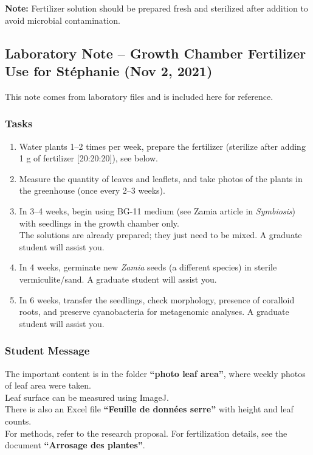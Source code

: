 \documentclass[
  11pt,
]{article}
\providecommand{\tightlist}{%
  \setlength{\itemsep}{0pt}\setlength{\parskip}{0pt}}
\begin{document}
\textbf{Note:} Fertilizer solution should be prepared fresh and
sterilized after addition to avoid microbial contamination.

\subsection{Laboratory Note -- Growth Chamber Fertilizer Use for
Stéphanie (Nov 2,
2021)}\label{laboratory-note-growth-chamber-fertilizer-use-for-stuxe9phanie-nov-2-2021}

This note comes from laboratory files and is included here for
reference.

\subsubsection{Tasks}\label{tasks}

\begin{enumerate}
\def\labelenumi{\arabic{enumi}.}
\tightlist
\item
  Water plants 1--2 times per week, prepare the fertilizer (sterilize
  after adding 1 g of fertilizer {[}20:20:20{]}), see below.\\
\item
  Measure the quantity of leaves and leaflets, and take photos of the
  plants in the greenhouse (once every 2--3 weeks).\\
\item
  In 3--4 weeks, begin using BG-11 medium (see Zamia article in
  \emph{Symbiosis}) with seedlings in the growth chamber only.\\
  The solutions are already prepared; they just need to be mixed. A
  graduate student will assist you.\\
\item
  In 4 weeks, germinate new \emph{Zamia} seeds (a different species) in
  sterile vermiculite/sand. A graduate student will assist you.\\
\item
  In 6 weeks, transfer the seedlings, check morphology, presence of
  coralloid roots, and preserve cyanobacteria for metagenomic analyses.
  A graduate student will assist you.
\end{enumerate}

\subsubsection{Student Message}\label{student-message}

The important content is in the folder \textbf{``photo leaf area''},
where weekly photos of leaf area were taken.\\
Leaf surface can be measured using ImageJ.\\
There is also an Excel file \textbf{``Feuille de données serre''} with
height and leaf counts.\\
For methods, refer to the research proposal. For fertilization details,
see the document \textbf{``Arrosage des plantes''}.
\end{document}
